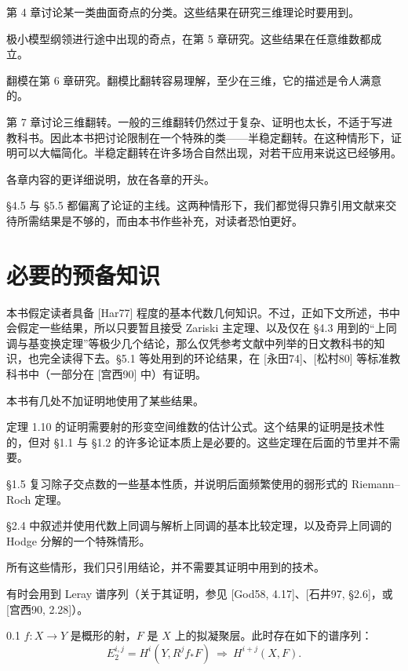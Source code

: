 第 4 章讨论某一类曲面奇点的分类。这些结果在研究三维理论时要用到。

极小模型纲领进行途中出现的奇点，在第 5 章研究。这些结果在任意维数都成立。

翻模在第 6 章研究。翻模比翻转容易理解，至少在三维，它的描述是令人满意的。

第 7 章讨论三维翻转。一般的三维翻转仍然过于复杂、证明也太长，不适于写进教科书。因此本书把讨论限制在一个特殊的类——半稳定翻转。在这种情形下，证明可以大幅简化。半稳定翻转在许多场合自然出现，对若干应用来说这已经够用。

各章内容的更详细说明，放在各章的开头。

§4.5 与 §5.5 都偏离了论证的主线。这两种情形下，我们都觉得只靠引用文献来交待所需结果是不够的，而由本书作些补充，对读者恐怕更好。

\section*{必要的预备知识}

本书假定读者具备 [Har77] 程度的基本代数几何知识。不过，正如下文所述，书中会假定一些结果，所以只要暂且接受 Zariski 主定理、以及仅在 §4.3 用到的“上同调与基变换定理”等极少几个结论，那么仅凭参考文献中列举的日文教科书的知识，也完全读得下去。§5.1 等处用到的环论结果，在 [永田74]、[松村80] 等标准教科书中（一部分在 [宫西90] 中）有证明。

本书有几处不加证明地使用了某些结果。

定理 1.10 的证明需要射的形变空间维数的估计公式。这个结果的证明是技术性的，但对 §1.1 与 §1.2 的许多论证本质上是必要的。这些定理在后面的节里并不需要。

§1.5 复习除子交点数的一些基本性质，并说明后面频繁使用的弱形式的 Riemann–Roch 定理。

§2.4 中叙述并使用代数上同调与解析上同调的基本比较定理，以及奇异上同调的 Hodge 分解的一个特殊情形。

所有这些情形，我们只引用结论，并不需要其证明中用到的技术。

有时会用到 Leray 谱序列（关于其证明，参见 [God58, 4.17]、[石井97, §2.6]，或 [宫西90, 2.28]）。%

\begin{theorem*}{0.1}
$f\colon X\to Y$ 是概形的射，$F$ 是 $X$ 上的拟凝聚层。此时存在如下的谱序列：
\[
E_2^{i,j}=H^i(Y,R^jf_*F)\ \Longrightarrow\ H^{i+j}(X,F).
\]
\end{theorem*}

